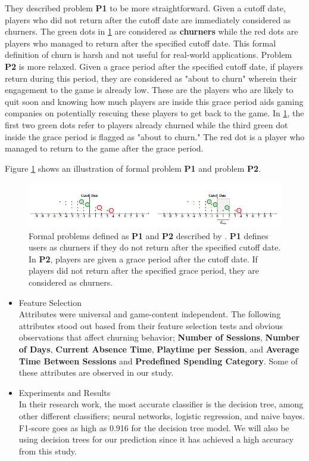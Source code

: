 They described problem \textbf{P1} to be more straightforward. Given a cutoff date, players who did not return after the cutoff date are immediately considered as churners. The green dots in \ref{fig:churn_figure} are considered as \textbf{churners} while the red dots are players who managed to return after the specified cutoff date. This formal definition of churn is harsh and not useful for real-world applications. Problem \textbf{P2} is more relaxed. Given a grace period after the specified cutoff date, if players return during this period, they are considered as "about to churn" wherein their engagement to the game is already low. These are the players who are likely to quit soon and knowing how much players are inside this grace period aids gaming companies on potentially rescuing these players to get back to the game. In \ref{fig:churn_figure}, the first two green dots refer to players already churned while the third green dot inside the grace period is flagged as "about to churn." The red dot is a player who managed to return to the game after the grace period.

Figure \ref{fig:churn_figure} shows an illustration of formal problem \textbf{P1} and problem \textbf{P2}.

\begin{figure}[h]
\centering
\includegraphics[scale=0.6]{figures/churn.png}
\caption{Formal problems defined as \textbf{P1} and \textbf{P2} described by \cite{ref:predicting_player_churn}. \textbf{P1} defines users as churners if they do not return after the specified cutoff date. In \textbf{P2}, players are given a grace period after the cutoff date. If players did not return after the specified grace period, they are considered as churners. }
\label{fig:churn_figure}
\end{figure}


\begin{itemize}
\item Feature Selection \\
Attributes were universal and game-content independent. The following attributes stood out based from their feature selection tests and obvious observations that affect churning behavior; \textbf{Number of Sessions}, \textbf{Number of Days}, \textbf{Current Absence Time}, \textbf{Playtime per Session}, and \textbf{Average Time Between Sessions} and \textbf{Predefined Spending Category}. Some of these attributes are observed in our study.

\item Experiments and Results \\
In their research work, the  most accurate classifier is the decision tree, among other different classifiers; neural networks, logistic regression, and naive bayes. F1-score goes as high as 0.916 for the decision tree model. We will also be using decision trees for our prediction since it has achieved a high accuracy from this study.
\end{itemize}


